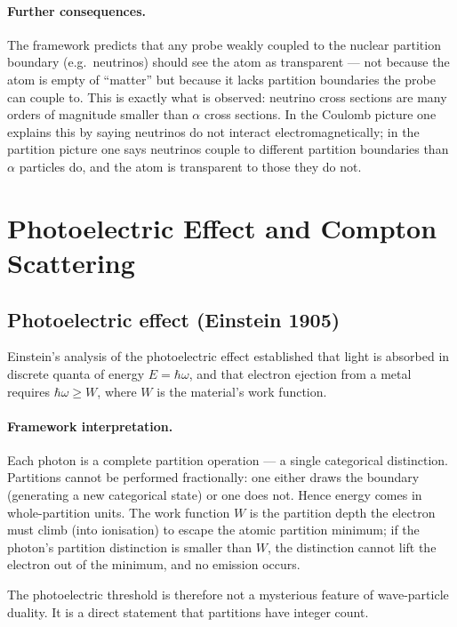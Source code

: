 \documentclass[11pt,a4paper]{article}
\theoremstyle{definition}
\theoremstyle{remark}
\begin{document}
\paragraph{Further consequences.} The framework predicts that any probe weakly coupled to the nuclear partition boundary (e.g.\ neutrinos) should see the atom as transparent --- not because the atom is empty of ``matter'' but because it lacks partition boundaries the probe can couple to. This is exactly what is observed: neutrino cross sections are many orders of magnitude smaller than $\alpha$ cross sections. In the Coulomb picture one explains this by saying neutrinos do not interact electromagnetically; in the partition picture one says neutrinos couple to different partition boundaries than $\alpha$ particles do, and the atom is transparent to those they do not.

\section{Photoelectric Effect and Compton Scattering}
\label{sec:photo}

\subsection{Photoelectric effect (Einstein 1905)}

Einstein's analysis \citep{einstein1905photoelectric} of the photoelectric effect established that light is absorbed in discrete quanta of energy $E = \hbar\omega$, and that electron ejection from a metal requires $\hbar\omega \ge W$, where $W$ is the material's work function.

\paragraph{Framework interpretation.} Each photon is a complete partition operation --- a single categorical distinction. Partitions cannot be performed fractionally: one either draws the boundary (generating a new categorical state) or one does not. Hence energy comes in whole-partition units. The work function $W$ is the partition depth the electron must climb (into ionisation) to escape the atomic partition minimum; if the photon's partition distinction is smaller than $W$, the distinction cannot lift the electron out of the minimum, and no emission occurs.

The photoelectric threshold is therefore not a mysterious feature of wave-particle duality. It is a direct statement that partitions have integer count.
\end{document}
